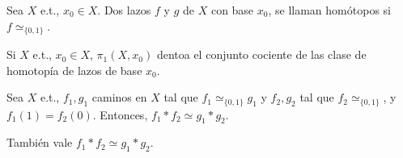 \begin{defn}
  Sea $X$ e.t., $x_{0} \in X$. Dos lazos $f$ y $g$ de $X$ con base $x_{0}$, se llaman homótopos si $f \simeq_{\{ 0, 1 \}}$.
\end{defn}

\begin{nota}
  Si $X$ e.t., $x_{0} \in X$, $\pi_{1}(X, x_{0})$ dentoa el conjunto cociente de las clase de homotopía de lazos de base $x_{0}$.
\end{nota}

\begin{prop}
  Sea $X$ e.t., $f_{1}, g_{1}$ caminos en $X$ tal que $f_{1} \simeq_{\{ 0, 1 \}} g_{1}$ y $f_{2}, g_{2}$ tal que $f_{2} \simeq_{\{ 0, 1 \}}$, y $f_{1}(1) = f_{2}(0)$. Entonces, $f_{1} * f_{2} \simeq g_{1} * g_{2}$.
\end{prop}

\begin{obs}
  También vale $f_{1} * f_{2} \simeq g_{1} * g_{2}$.
\end{obs}

